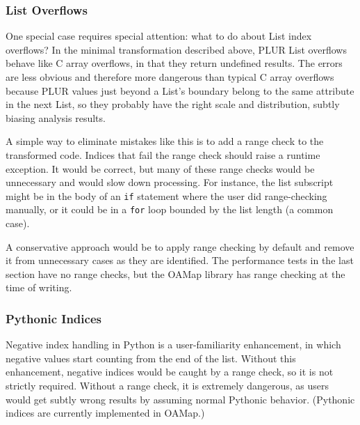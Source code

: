\documentclass[10pt, conference, compsocconf]{IEEEtran}
\begin{document}
\subsubsection{List Overflows}

One special case requires special attention: what to do about List index overflows? In the minimal transformation described above, PLUR List overflows behave like C array overflows, in that they return undefined results. The errors are less obvious and therefore more dangerous than typical C array overflows because PLUR values just beyond a List's boundary belong to the same attribute in the next List, so they probably have the right scale and distribution, subtly biasing analysis results.

A simple way to eliminate mistakes like this is to add a range check to the transformed code. Indices that fail the range check should raise a runtime exception. It would be correct, but many of these range checks would be unnecessary and would slow down processing. For instance, the list subscript might be in the body of an {\tt if} statement where the user did range-checking manually, or it could be in a {\tt for} loop bounded by the list length (a common case).

A conservative approach would be to apply range checking by default and remove it from unnecessary cases as they are identified. The performance tests in the last section have no range checks, but the OAMap library has range checking at the time of writing.


\subsubsection{Pythonic Indices}

Negative index handling in Python is a user-familiarity enhancement, in which negative values start counting from the end of the list. Without this enhancement, negative indices would be caught by a range check, so it is not strictly required. Without a range check, it is extremely dangerous, as users would get subtly wrong results by assuming normal Pythonic behavior. (Pythonic indices are currently implemented in OAMap.)
\end{document}
